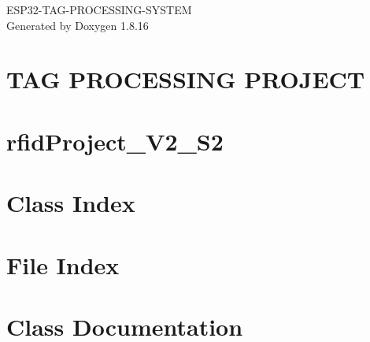 \let\mypdfximage\pdfximage\def\pdfximage{\immediate\mypdfximage}\documentclass[twoside]{book}
\newcommand{\+}{\discretionary{\mbox{\scriptsize$\hookleftarrow$}}{}{}}
\newcommand{\clearemptydoublepage}{%
  \newpage{\pagestyle{empty}\cleardoublepage}%
}
\begin{document}
\hypersetup{pageanchor=false,
             bookmarksnumbered=true,
             pdfencoding=unicode
            }
\begin{titlepage}
\vspace*{7cm}
\begin{center}%
{\Large E\+S\+P32-\/\+T\+A\+G-\/\+P\+R\+O\+C\+E\+S\+S\+I\+N\+G-\/\+S\+Y\+S\+T\+EM }\\
\vspace*{1cm}
{\large Generated by Doxygen 1.8.16}\\
\end{center}
\end{titlepage}
\clearemptydoublepage
{}
\tableofcontents
\clearemptydoublepage
{}
\hypersetup{pageanchor=true}

\chapter{T\+AG P\+R\+O\+C\+E\+S\+S\+I\+NG P\+R\+O\+J\+E\+CT}
\label{index}\hypertarget{index}{}
\chapter{rfid\+Project\+\_\+\+V2\+\_\+\+S2}
\label{md__home_lance_eclipse-workspace_rfidProject_V2_S2_README}

\chapter{Class Index}

\chapter{File Index}

\chapter{Class Documentation}















\end{document}
